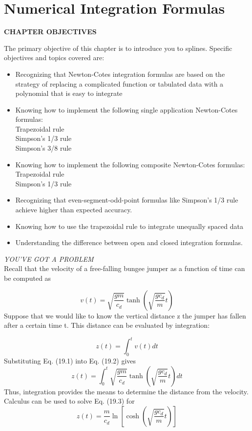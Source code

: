 \documentclass[../main.tex]{subfiles}
\begin{document}
\chapter{Numerical Integration Formulas}\label{chap:chap19}

\begin{center}
    \Large{\textbf{CHAPTER OBJECTIVES}}
\end{center}
The primary objective of this chapter is to introduce you to splines. Specific objectives
and topics covered are:

\begin{itemize}
    \item Recognizing that Newton-Cotes integration formulas are based on the strategy of
	replacing a complicated function or tabulated data with a polynomial that is easy
	to integrate
	\item Knowing how to implement the following single application Newton-Cotes
	formulas:\\
	\> Trapezoidal rule\\
	\> Simpson's 1/3 rule\\
	\> Simpson's 3/8 rule
    \item Knowing how to implement the following composite Newton-Cotes formulas:
	\\\> Trapezoidal rule\\
	\> Simpson's 1/3 rule
    \item Recognizing that even-segment-odd-point formulas like Simpson's 1/3 rule
	achieve higher than expected accuracy.
    \item Knowing how to use the trapezoidal rule to integrate unequally spaced data
    \item Understanding the difference between open and closed integration formulas.
\end{itemize}
\vspace{2cm}

\noindent\textit{YOU'VE GOT A PROBLEM}\\
Recall that the velocity of a free-falling bungee jumper as a function of time can be
computed as

\begin{equation}
	\tag{19.1}
	v(t)=\sqrt{\frac{g m}{c_{d}}} \tanh \left(\sqrt{\frac{g c_{d}}{m}} t\right)
	\end{equation}
	Suppose that we would like to know the vertical distance z the jumper has fallen after a
	certain time t. This distance can be evaluated by integration:

	\begin{equation}
		\tag{19.2}
	z(t)=\int_{0}^{t} v(t) d t
\end{equation}
	Substituting Eq. (19.1) into Eq. (19.2) gives
	\begin{equation}
		\tag{19.3}
	z(t)=\int_{0}^{t} \sqrt{\frac{g m}{c_{d}}} \tanh \left(\sqrt{\frac{g c_{d}}{m}} t\right) d t
\end{equation}
	Thus, integration provides the means to determine the distance from the velocity. Calculus can be used to solve Eq. (19.3) for
	\begin{equation}
		\tag{19.4}
	z(t)=\frac{m}{c_{d}} \ln \left[\cosh \left(\sqrt{\frac{g c_{d}}{m}} t\right)\right]
\end{equation}
\end{document}
